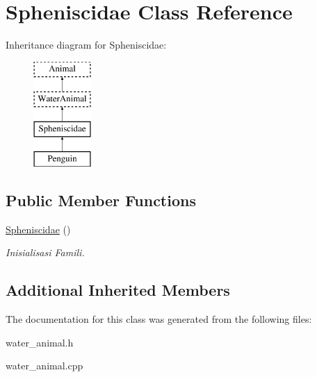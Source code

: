 \hypertarget{class_spheniscidae}{}\section{Spheniscidae Class Reference}
\label{class_spheniscidae}
Inheritance diagram for Spheniscidae\+:\begin{figure}[H]
\begin{center}
\leavevmode
\includegraphics[height=4.000000cm]{class_spheniscidae}
\end{center}
\end{figure}
\subsection*{Public Member Functions}
\begin{DoxyCompactItemize}
\item 
\hyperlink{class_spheniscidae_ad402b65c2e77a9af58fae4d1afd7a2dd}{Spheniscidae} ()\hypertarget{class_spheniscidae_ad402b65c2e77a9af58fae4d1afd7a2dd}{}\label{class_spheniscidae_ad402b65c2e77a9af58fae4d1afd7a2dd}

\begin{DoxyCompactList}\small\item\em Inisialisasi Famili. \end{DoxyCompactList}\end{DoxyCompactItemize}
\subsection*{Additional Inherited Members}


The documentation for this class was generated from the following files\+:\begin{DoxyCompactItemize}
\item 
water\+\_\+animal.\+h\item 
water\+\_\+animal.\+cpp\end{DoxyCompactItemize}
